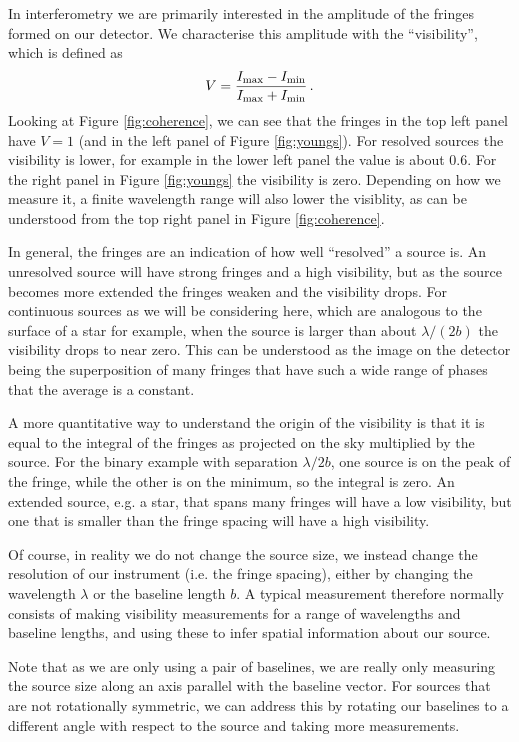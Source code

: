 \documentclass[11pt]{article}
\begin{document}
In interferometry we are primarily interested in the amplitude of the fringes formed on our detector. We characterise this amplitude with the ``visibility'', which is defined as
\begin{equation}
    V = \frac{I_{\rm max} - I_{\rm min}}{I_{\rm max} + I_{\rm min}} \, .
\end{equation}
Looking at Figure \ref{fig:coherence}, we can see that the fringes in the top left panel have $V=1$ (and in the left panel of Figure \ref{fig:youngs}). For resolved sources the visibility is lower, for example in the lower left panel the value is about 0.6. For the right panel in Figure \ref{fig:youngs} the visibility is zero. Depending on how we measure it, a finite wavelength range will also lower the visiblity, as can be understood from the top right panel in Figure \ref{fig:coherence}.

In general, the fringes are an indication of how well ``resolved'' a source is. An unresolved source will have strong fringes and a high visibility, but as the source becomes more extended the fringes weaken and the visibility drops. For continuous sources as we will be considering here, which are analogous to the surface of a star for example, when the source is larger than about $\lambda/(2b)$ the visibility drops to near zero. This can be understood as the image on the detector being the superposition of many fringes that have such a wide range of phases that the average is a constant.

A more quantitative way to understand the origin of the visibility is that it is equal to the integral of the fringes as projected on the sky multiplied by the source. For the binary example with separation $\lambda/2b$, one source is on the peak of the fringe, while the other is on the minimum, so the integral is zero. An extended source, e.g. a star, that spans many fringes will have a low visibility, but one that is smaller than the fringe spacing will have a high visibility.

Of course, in reality we do not change the source size, we instead change the resolution of our instrument (i.e. the fringe spacing), either by changing the wavelength $\lambda$ or the baseline length $b$. A typical measurement therefore normally consists of making visibility measurements for a range of wavelengths and baseline lengths, and using these to infer spatial information about our source.

Note that as we are only using a pair of baselines, we are really only measuring the source size along an axis parallel with the baseline vector. For sources that are not rotationally symmetric, we can address this by rotating our baselines to a different angle with respect to the source and taking more measurements.
\end{document}
